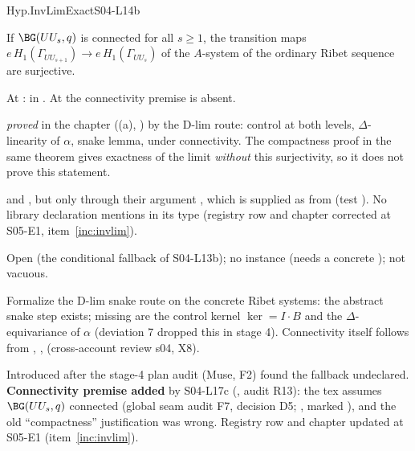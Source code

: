 \begin{hypentry}{Hyp.InvLimExact}{\kindinfra}{S04-L14b}
\item[Statement] If $\BG(UU_s,q)$ is connected for all $s\ge1$, the transition maps
  $e\,H_1(\Gamma_{UU_{s+1}})\to e\,H_1(\Gamma_{UU_s})$ of the $A$-system of the ordinary Ribet sequence are surjective.
\item[Lean] At :  in . At  the connectivity
  premise is absent.
\item[Source] \emph{proved} in the chapter ((a), \stproved) by the D-lim route: control at
  both levels, $\Delta$-linearity of $\alpha$, snake lemma, under connectivity. The compactness proof in the same theorem
  gives exactness of the limit \emph{without} this surjectivity, so it does not prove this statement.
\item[Used by]  and , but only through their
  argument , which is supplied as  from
   (test ). No library declaration mentions
   in its type (registry row and chapter corrected at S05-E1, item~\ref{inc:invlim}).
\item[Status] Open (the conditional fallback of S04-L13b); no instance (needs a concrete ); not
  vacuous.
\item[Discharge] Formalize the D-lim snake route on the concrete Ribet systems: the abstract snake step
   exists; missing are the control kernel $\ker=I\cdot B$ and the
  $\Delta$-equivariance of $\alpha$ (deviation 7 dropped this in stage 4). Connectivity itself follows from
  , ,  (cross-account review s04, X8).
\item[History, corrections] Introduced after the stage-4 plan audit (Muse, F2) found the fallback undeclared.
  \textbf{Connectivity premise added} by S04-L17c (, audit R13): the tex assumes $\BG(UU_s,q)$ connected
  (global seam audit F7, decision D5; , marked ), and the
  old ``compactness'' justification was wrong. Registry row and chapter updated at S05-E1 (item~\ref{inc:invlim}).
\end{hypentry}

